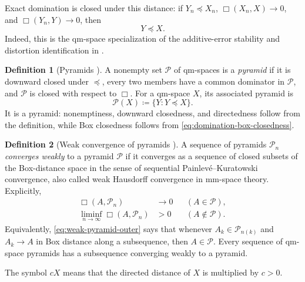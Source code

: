 \documentclass{amsart}
\numberwithin{equation}{section}
\theoremstyle{plain}
\theoremstyle{definition}
\newtheorem*{definition*}{Definition}
\theoremstyle{remark}
\newcommand{\Pyr}{\mathcal P}
\begin{document}
Exact domination is closed under this distance: if $Y_n\preceq X_n$, $\Box(X_n,X)\to0$, and $\Box(Y_n,Y)\to0$, then
\begin{equation}\label{eq:domination-box-closedness} Y\preceq X. \end{equation}
Indeed, this is the qm-space specialization of the additive-error stability and distortion identification in \cite[Definition~3.1 and Propositions~3.4, 3.5, and~3.8]{one-sided-pyramids}.

\begin{definition*}[Pyramids {\cite[Definition~A.2]{gds3-ja}}]
A nonempty set $\mathcal P$ of qm-spaces is a \emph{pyramid} if it is downward closed under $\preceq$, every two members have a common dominator in $\mathcal P$, and $\mathcal P$ is closed with respect to $\Box$.  For a qm-space $X$, its associated pyramid \cite[Proposition~A.9]{gds3-ja} is
\[ \Pyr(X)\coloneqq\{Y\colon Y\preceq X\}. \]
It is a pyramid: nonemptiness, downward closedness, and directedness follow from the definition, while Box closedness follows from \eqref{eq:domination-box-closedness}.
\end{definition*}

\begin{definition*}[Weak convergence of pyramids {\cite[Definition~A.3, Theorem~5.1, and Corollary~5.3]{gds3-ja}}]
A sequence of pyramids $\mathcal P_n$ \emph{converges weakly} to a pyramid $\mathcal P$ if it converges as a sequence of closed subsets of the Box-distance space in the sense of sequential Painlev\'e--Kuratowski convergence, also called weak Hausdorff convergence in mm-space theory.  Explicitly,
\begin{align}
\Box(A,\mathcal P_n)&\longrightarrow0 &&(A\in\mathcal P), \label{eq:weak-pyramid-inner}\\
\liminf_{n\to\infty}\Box(A,\mathcal P_n)&>0 &&(A\notin\mathcal P). \label{eq:weak-pyramid-outer}
\end{align}
Equivalently, \eqref{eq:weak-pyramid-outer} says that whenever $A_k\in\mathcal P_{n(k)}$ and $A_k\to A$ in Box distance along a subsequence, then $A\in\mathcal P$.  Every sequence of qm-space pyramids has a subsequence converging weakly to a pyramid.
\end{definition*}

The symbol $cX$ means that the directed distance of $X$ is multiplied by $c>0$.
\end{document}
